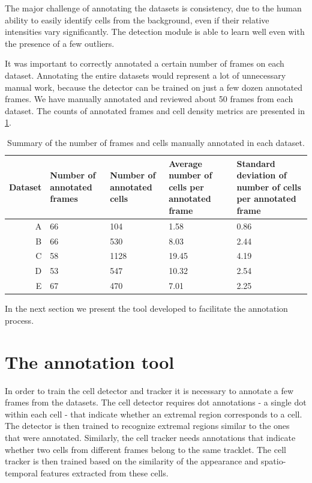 	The major challenge of annotating the datasets is consistency, due to the human ability to easily identify cells from the background, even if their relative intensities vary significantly. The detection module is able to learn well even with the presence of a few outliers.
	
	It was important to correctly annotated a certain number of frames on each dataset. Annotating the entire datasets would represent a lot of unnecessary manual work, because the detector can be trained on just a few dozen annotated frames. We have manually annotated and reviewed about 50 frames from each dataset. The counts of annotated frames and cell density metrics are presented in \cref{tab:results_data_count}.

	\begin{table}[h]
		\centering
		\begin{tabular}{rp{3cm}p{3cm}p{3cm}p{4cm}}
			Dataset & Number of annotated frames & Number of annotated cells & Average number of cells per annotated frame & Standard deviation of number of cells per annotated frame \\
		\hline
			      A &    66   &   104 &   1.58  &    0.86  \\
			      B &    66   &   530 &   8.03  &    2.44  \\
			      C &    58   &  1128 &  19.45  &    4.19 \\
			      D &    53   &   547 &  10.32  &    2.54 \\
			      E &    67   &   470 &   7.01  &    2.25 
		\end{tabular} 
		\caption{
			Summary of the number of frames and cells manually annotated in each dataset.}
		\label{tab:results_data_count}
	\end{table}
	
	In the next section we present the tool developed to facilitate the annotation process.

    \section{The annotation tool \statusfirstdraft}
    \label{sec:data_tool}
    	In order to train the cell detector and tracker it is necessary to annotate a few frames from the datasets. The cell detector requires dot annotations - a single dot within each cell - that indicate whether an extremal region corresponds to a cell. The detector is then trained to recognize extremal regions similar to the ones that were annotated. Similarly, the cell tracker needs annotations that indicate whether two cells from different frames belong to the same tracklet. The cell tracker is then trained based on the similarity of the appearance and spatio-temporal features extracted from these cells.
    	
